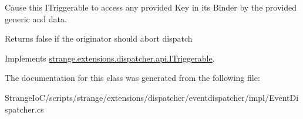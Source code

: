 Cause this I\-Triggerable to access any provided Key in its Binder by the provided generic and data. 

\begin{DoxyReturn}{Returns}
false if the originator should abort dispatch
\end{DoxyReturn}


Implements \hyperlink{interfacestrange_1_1extensions_1_1dispatcher_1_1api_1_1_i_triggerable_ab51a637635cbd1819f5d33f00831c8d5}{strange.\-extensions.\-dispatcher.\-api.\-I\-Triggerable}.



The documentation for this class was generated from the following file\-:\begin{DoxyCompactItemize}
\item 
Strange\-Io\-C/scripts/strange/extensions/dispatcher/eventdispatcher/impl/Event\-Dispatcher.\-cs\end{DoxyCompactItemize}
